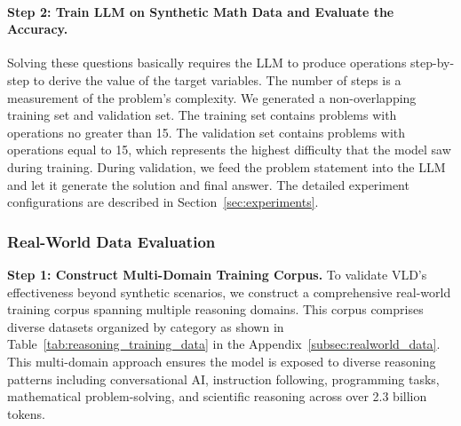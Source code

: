 \documentclass{article} %
\begin{document}
\vspace{0.2cm}
\vspace{0.2cm}





\paragraph{Step 2: Train LLM on Synthetic Math Data and Evaluate the Accuracy.} Solving these questions basically requires the LLM to produce operations step-by-step to derive the value of the target variables. The number of steps is a measurement of the problem's complexity. We generated a non-overlapping training set and validation set. The training set contains problems with operations no greater than 15. The validation set contains problems with operations equal to 15, which represents the highest difficulty that the model saw during training. During validation, we feed the problem statement into the LLM and let it generate the solution and final answer. The detailed experiment configurations are described in Section~\ref{sec:experiments}.


\subsubsection{Real-World Data Evaluation}

\textbf{Step 1: Construct Multi-Domain Training Corpus.} To validate VLD's effectiveness beyond synthetic scenarios, we construct a comprehensive real-world training corpus spanning multiple reasoning domains. This corpus comprises diverse datasets organized by category as shown in Table~\ref{tab:reasoning_training_data} in the Appendix~\ref{subsec:realworld_data}. This multi-domain approach ensures the model is exposed to diverse reasoning patterns including conversational AI, instruction following, programming tasks, mathematical problem-solving, and scientific reasoning across over 2.3 billion tokens.
\end{document}
